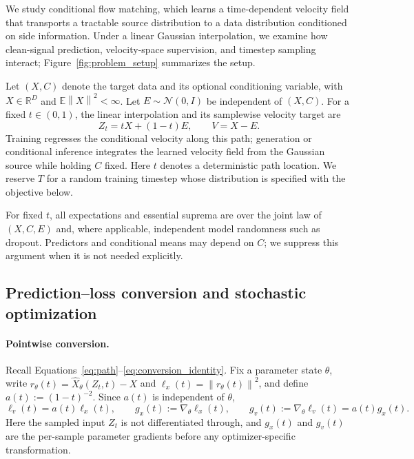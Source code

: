 \documentclass{article}
\theoremstyle{plain}
\theoremstyle{definition}
\theoremstyle{remark}
\newcommand{\Ex}{\mathbb{E}}
\newcommand{\R}{\mathbb{R}}
\newcommand{\norm}[1]{\left\lVert #1\right\rVert}
\begin{document}
We study conditional flow matching, which learns a time-dependent velocity field that transports a tractable source distribution to a data distribution conditioned on side information. Under a linear Gaussian interpolation, we examine how clean-signal prediction, velocity-space supervision, and timestep sampling interact; Figure~\ref{fig:problem_setup} summarizes the setup.

Let $(X,C)$ denote the target data and its optional conditioning variable, with $X\in\R^D$ and $\Ex\norm{X}^2<\infty$. Let $E\sim\mathcal N(0,I)$ be independent of $(X,C)$. For a fixed $t\in(0,1)$, the linear interpolation and its samplewise velocity target are
\begin{equation}
Z_t=tX+(1-t)E,
\qquad V=X-E.
\label{eq:formal_path}
\end{equation}
Training regresses the conditional velocity along this path; generation or conditional inference integrates the learned velocity field from the Gaussian source while holding $C$ fixed. Here $t$ denotes a deterministic path location. We reserve $T$ for a random training timestep whose distribution is specified with the objective below.

\WFclear\vspace{1.5\baselineskip}
For fixed $t$, all expectations and essential suprema are over the joint law of $(X,C,E)$ and, where applicable, independent model randomness such as dropout. Predictors and conditional means may depend on $C$; we suppress this argument when it is not needed explicitly.

\subsection{Prediction--loss conversion and stochastic optimization}

\paragraph{Pointwise conversion.}
Recall Equations~\eqref{eq:path}--\eqref{eq:conversion_identity}. Fix a parameter state $\theta$, write $r_\theta(t)=\hat X_\theta(Z_t,t)-X$ and $\ell_x(t)=\norm{r_\theta(t)}^2$, and define $a(t):=(1-t)^{-2}$. Since $a(t)$ is independent of $\theta$,
\begin{equation}
\ell_v(t)=a(t)\ell_x(t),\qquad
g_x(t):=\nabla_\theta\ell_x(t),\qquad
g_v(t):=\nabla_\theta\ell_v(t)=a(t)g_x(t).
\label{eq:formal_conversion}
\end{equation}
Here the sampled input $Z_t$ is not differentiated through, and $g_x(t)$ and $g_v(t)$ are the per-sample parameter gradients before any optimizer-specific transformation.
\end{document}
